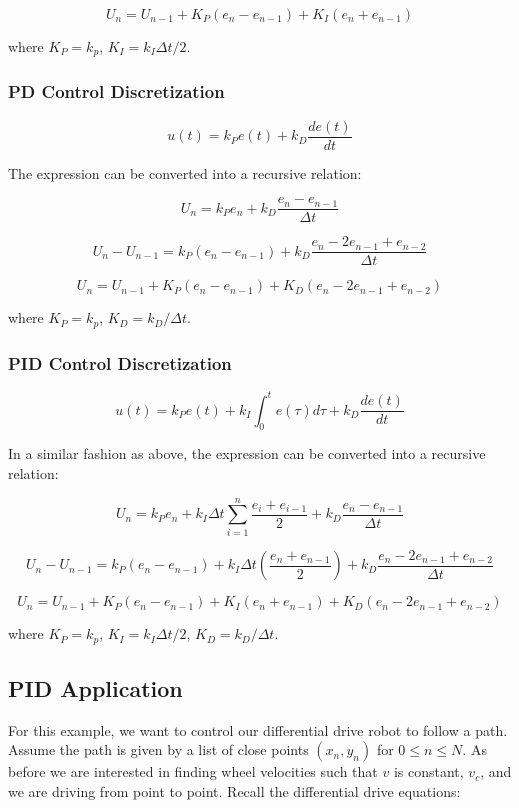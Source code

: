\[U_n = U_{n-1} + K_P(e_n - e_{n-1}) + K_I (e_n + e_{n-1})\]

where \(K_P = k_p\), \(K_I = k_I \Delta t  / 2\).

\hypertarget{pd-control-discretization}{%
\subsubsection{PD Control
Discretization}\label{pd-control-discretization}}

\[u(t) = k_P e(t) + k_D \frac{de(t)}{dt}\]

The expression can be converted into a recursive relation:

\[U_n  = k_P e_n + k_D \frac{e_n - e_{n-1}}{\Delta t}\]

\[U_n - U_{n-1} = k_P(e_n - e_{n-1}) + k_D \frac{e_n - 2e_{n-1} +e_{n-2}}{\Delta t}\]

\[U_n = U_{n-1} + K_P(e_n - e_{n-1}) + K_D (e_n - 2e_{n-1} +e_{n-2})\]

where \(K_P = k_p\), \(K_D = k_D / \Delta t\).

\hypertarget{pid-control-discretization}{%
\subsubsection{PID Control
Discretization}\label{pid-control-discretization}}

\[u(t) = k_P e(t) + k_I \int_0^t e(\tau)d\tau + k_D \frac{de(t)}{dt}\]

In a similar fashion as above, the expression can be converted into a
recursive relation:

\[U_n  = k_P e_n + k_I \Delta t \sum_{i=1}^n \frac{e_i + e_{i-1}}{2}  + k_D \frac{e_n - e_{n-1}}{\Delta t}\]

\[U_n - U_{n-1} = k_P(e_n - e_{n-1}) + k_I \Delta t \left( \frac{e_n + e_{n-1}}{2}\right)  + k_D \frac{e_n - 2e_{n-1} +e_{n-2}}{\Delta t}\]

\[U_n = U_{n-1} + K_P(e_n - e_{n-1}) + K_I (e_n + e_{n-1}) + K_D (e_n - 2e_{n-1} +e_{n-2})\]

where \(K_P = k_p\), \(K_I = k_I \Delta t  / 2\),
\(K_D = k_D / \Delta t\).

\hypertarget{pid-application}{%
\subsection{PID Application}\label{pid-application}}

For this example, we want to control our differential drive robot to
follow a path. Assume the path is given by a list of close points
\((x_n, y_n)\) for \(0 \leq n \leq N\). As before we are interested in
finding wheel velocities such that \(v\) is constant, \(v_c\), and we
are driving from point to point. Recall the differential drive
equations:

